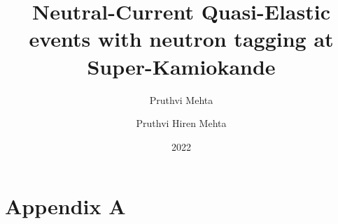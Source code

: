 \documentclass[11pt,twoside]{report}
\author{Pruthvi Mehta}
\date{2022}
\title{\textbf{Neutral-Current Quasi-Elastic events with neutron tagging at Super-Kamiokande}} \let\Title\@title
\author{Pruthvi Hiren Mehta} \let\Author\@author
\begin{document}


\cleardoublepage


\begin{singlespace}

  
  
  
  \end{singlespace}
  \cleardoublepage




    \tableofcontents


    

    
    
    
    
    
    
    
    
 

      
    


\appendix
\chapter{Appendix A}

\end{document}
